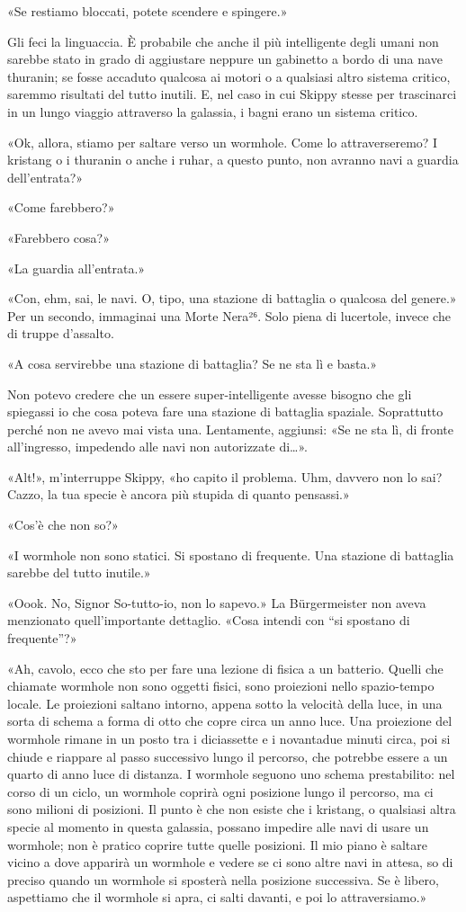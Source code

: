 «Se restiamo bloccati, potete scendere e spingere.»

Gli feci la linguaccia. È probabile che anche il più intelligente degli
umani non sarebbe stato in grado di aggiustare neppure un gabinetto a
bordo di una nave thuranin; se fosse accaduto qualcosa ai motori o a
qualsiasi altro sistema critico, saremmo risultati del tutto inutili. E,
nel caso in cui Skippy stesse per trascinarci in un lungo viaggio
attraverso la galassia, i bagni erano un sistema critico.

«Ok, allora, stiamo per saltare verso un wormhole. Come lo
attraverseremo? I kristang o i thuranin o anche i ruhar, a questo punto,
non avranno navi a guardia dell'entrata?»

«Come farebbero?»

«Farebbero cosa?»

«La guardia all'entrata.»

«Con, ehm, sai, le navi. O, tipo, una stazione di battaglia o qualcosa
del genere.» Per un secondo, immaginai una Morte Nera²⁶. Solo piena di
lucertole, invece che di truppe d'assalto.

«A cosa servirebbe una stazione di battaglia? Se ne sta lì e basta.»

Non potevo credere che un essere super-intelligente avesse bisogno che
gli spiegassi io che cosa poteva fare una stazione di battaglia
spaziale. Soprattutto perché non ne avevo mai vista una. Lentamente,
aggiunsi: «Se ne sta lì, di fronte all'ingresso, impedendo alle navi non
autorizzate di\ldots».

«Alt!», m'interruppe Skippy, «ho capito il problema. Uhm, davvero non lo
sai? Cazzo, la tua specie è ancora più stupida di quanto pensassi.»

«Cos'è che non so?»

«I wormhole non sono statici. Si spostano di frequente. Una stazione di
battaglia sarebbe del tutto inutile.»

«Oook. No, Signor So-tutto-io, non lo sapevo.» La Bürgermeister non
aveva menzionato quell'importante dettaglio. «Cosa intendi con ``si
spostano di frequente''?»

«Ah, cavolo, ecco che sto per fare una lezione di fisica a un batterio.
Quelli che chiamate wormhole non sono oggetti fisici, sono proiezioni
nello spazio-tempo locale. Le proiezioni saltano intorno, appena sotto
la velocità della luce, in una sorta di schema a forma di otto che copre
circa un anno luce. Una proiezione del wormhole rimane in un posto tra i
diciassette e i novantadue minuti circa, poi si chiude e riappare al
passo successivo lungo il percorso, che potrebbe essere a un quarto di
anno luce di distanza. I wormhole seguono uno schema prestabilito: nel
corso di un ciclo, un wormhole coprirà ogni posizione lungo il percorso,
ma ci sono milioni di posizioni. Il punto è che non esiste che i
kristang, o qualsiasi altra specie al momento in questa galassia,
possano impedire alle navi di usare un wormhole; non è pratico coprire
tutte quelle posizioni. Il mio piano è saltare vicino a dove apparirà un
wormhole e vedere se ci sono altre navi in attesa, so di preciso quando
un wormhole si sposterà nella posizione successiva. Se è libero,
aspettiamo che il wormhole si apra, ci salti davanti, e poi lo
attraversiamo.»

